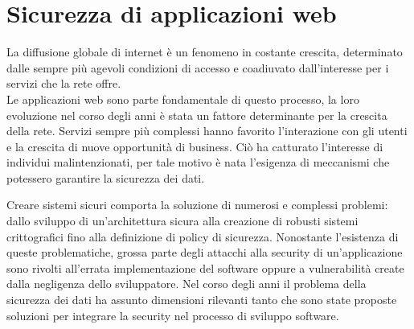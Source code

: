 \chapter{Sicurezza di applicazioni web}

\begin{epigraphs}
\end{epigraphs}

La diffusione globale di internet è un fenomeno in costante crescita, determinato dalle sempre più agevoli condizioni di accesso e coadiuvato dall'interesse per i servizi che la rete offre. \\
Le applicazioni web sono parte fondamentale di questo processo, la loro evoluzione nel corso degli anni è stata un fattore determinante per la crescita della rete. Servizi sempre più complessi hanno favorito l'interazione con gli utenti e la crescita di nuove opportunità di business. Ciò ha catturato l'interesse di individui malintenzionati, per tale motivo è nata l'esigenza di meccanismi che potessero garantire la sicurezza dei dati.

Creare sistemi sicuri comporta la soluzione di numerosi e complessi problemi: dallo sviluppo di un'architettura sicura alla creazione di robusti sistemi crittografici fino alla definizione di policy di sicurezza. Nonostante l'esistenza di queste problematiche, grossa parte degli attacchi alla security di un'applicazione sono rivolti all'errata implementazione del software oppure a vulnerabilità create dalla negligenza dello sviluppatore.
Nel corso degli anni il problema della sicurezza dei dati ha assunto dimensioni rilevanti tanto che sono state proposte soluzioni per integrare la security nel processo di sviluppo software.

